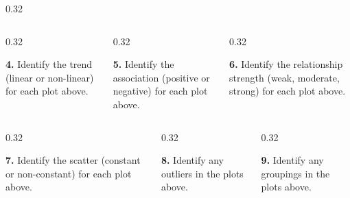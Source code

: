 \documentclass[aspectratio=169,12pt]{beamer}
\newcommand{\MMProblem}[2]{\begin{MMProblemCard}\raggedright\small\textbf{#1.} #2\par\end{MMProblemCard}}
\begin{document}
\begin{frame}[t]
\begin{columns}[T,onlytextwidth]
\begin{column}{0.32\textwidth}
{\begin{tikzpicture}[x=0.3cm,y=0.3cm,baseline=(current bounding box.center)]
\end{tikzpicture}}\end{column}
\end{columns}
\vspace{0.45em}
\begin{columns}[T,onlytextwidth]
\begin{column}{0.32\textwidth}\MMProblem{4}{Identify the trend (linear or non-linear) for each plot above.}\end{column}
\begin{column}{0.32\textwidth}\MMProblem{5}{Identify the association (positive or negative) for each plot above.}\end{column}
\begin{column}{0.32\textwidth}\MMProblem{6}{Identify the relationship strength (weak, moderate, strong) for each plot above.}\end{column}
\end{columns}
\vspace{0.45em}
\begin{columns}[T,onlytextwidth]
\begin{column}{0.32\textwidth}\MMProblem{7}{Identify the scatter (constant or non-constant) for each plot above.}\end{column}
\begin{column}{0.32\textwidth}\MMProblem{8}{Identify any outliers in the plots above.}\end{column}
\begin{column}{0.32\textwidth}\MMProblem{9}{Identify any groupings in the plots above.}\end{column}
\end{columns}
\end{frame}
\end{document}
